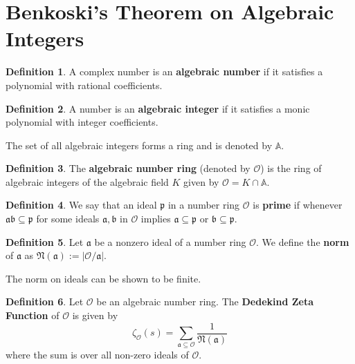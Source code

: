 \documentclass[10pt,a4paper]{article}
\theoremstyle{definition}
\newtheorem{definition}{Definition}[section]
\theoremstyle{remark}
\newcommand{\f}[1]{\mathfrak{#1}}
\begin{document}
	\section{Benkoski's Theorem on Algebraic Integers}
	
	\begin{definition} A complex number is an \textbf{algebraic number} if it satisfies a polynomial with rational coefficients.
	\end{definition}

	\begin{definition}A number is an \textbf{algebraic integer} if it satisfies a monic polynomial with integer coefficients.
		
		The set of all algebraic integers forms a ring and is denoted by \(\mathbb{A}\).
	\end{definition}

	\begin{definition} The \textbf{algebraic number ring} (denoted by \(\mathcal{O}\)) is the ring of algebraic integers of the algebraic field \(K\) given by \(\mathcal{O}=K\cap \mathbb{A}\). 
	\end{definition}

	\begin{definition} 
		We say that an ideal \(\f{p}\) in a number ring $\mathcal{O}$ is \textbf{prime} if whenever \(\f{ab}\subseteq \f{p}\) for some ideals \(\f{a},\f{b}\) in $\mathcal{O}$ implies \(\f{a}\subseteq \f{p}\) or \(\f{b} \subseteq \f{p}\).  
	\end{definition}
	\begin{definition} \label{ideal-norm}
		Let $\mathfrak{a}$ be a nonzero ideal of a number ring $\mathcal{O}$. We
		define the \textbf{norm} of \(\f{a}\) as \(\f{N(a)}:=|\mathcal{O}/\f{a}|\).
	\end{definition}

	The norm on ideals can be shown to be finite. \cite{marcus_number_2012} 
	
	\begin{definition} Let \(\mathcal{O}\) be an algebraic number ring. The \textbf{Dedekind Zeta Function} of \(\mathcal{O}\) is given by \begin{equation}
			\zeta_\mathcal{O}(s)=\sum_{\f{a\subseteq \mathcal{O}}}\frac{1}{\f{N(a)}}
		\end{equation} where the sum is over all non-zero ideals of \(\mathcal{O}\).
	\end{definition}
\end{document}

